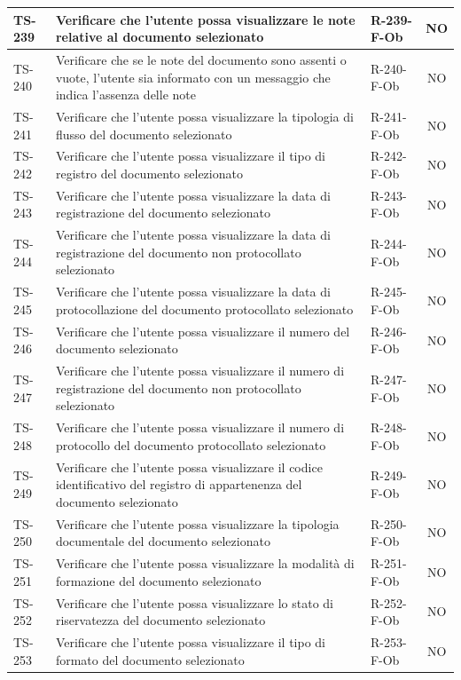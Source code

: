\documentclass[a4paper,12pt]{article}
\begin{document}
\begin{longtable}{|p{1.5cm}|p{8.3cm}|p{2.4cm}|c|}
\hline
TS-239 & Verificare che l'utente possa visualizzare le note relative al documento selezionato & R-239-F-Ob & NO \\
\hline
TS-240 & Verificare che se le note del documento sono assenti o vuote, l'utente sia informato con un messaggio che indica l'assenza delle note & R-240-F-Ob & NO \\
\hline
TS-241 & Verificare che l'utente possa visualizzare la tipologia di flusso del documento selezionato & R-241-F-Ob & NO \\
\hline
TS-242 & Verificare che l'utente possa visualizzare il tipo di registro del documento selezionato & R-242-F-Ob & NO \\
\hline
TS-243 & Verificare che l'utente possa visualizzare la data di registrazione del documento selezionato & R-243-F-Ob & NO \\
\hline
TS-244 & Verificare che l'utente possa visualizzare la data di registrazione del documento non protocollato selezionato & R-244-F-Ob & NO \\
\hline
TS-245 & Verificare che l'utente possa visualizzare la data di protocollazione del documento protocollato selezionato & R-245-F-Ob & NO \\
\hline
TS-246 & Verificare che l'utente possa visualizzare il numero del documento selezionato & R-246-F-Ob & NO \\
\hline
TS-247 & Verificare che l'utente possa visualizzare il numero di registrazione del documento non protocollato selezionato & R-247-F-Ob & NO \\
\hline
TS-248 & Verificare che l'utente possa visualizzare il numero di protocollo del documento protocollato selezionato & R-248-F-Ob & NO \\
\hline
TS-249 & Verificare che l'utente possa visualizzare il codice identificativo del registro di appartenenza del documento selezionato & R-249-F-Ob & NO \\
\hline
TS-250 & Verificare che l'utente possa visualizzare la tipologia documentale del documento selezionato & R-250-F-Ob & NO \\
\hline
TS-251 & Verificare che l'utente possa visualizzare la modalità di formazione del documento selezionato & R-251-F-Ob & NO \\
\hline
TS-252 & Verificare che l'utente possa visualizzare lo stato di riservatezza del documento selezionato & R-252-F-Ob & NO \\
\hline
TS-253 & Verificare che l'utente possa visualizzare il tipo di formato del documento selezionato & R-253-F-Ob & NO \\

\end{longtable}
\end{document}
